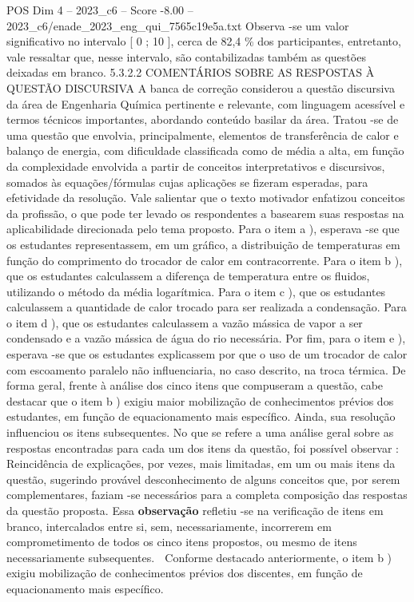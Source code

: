 \begin{textsample}{POS Dim 4 – 2023\_c6 – Score -8.00 – 2023\_c6/enade\_2023\_eng\_qui\_7565c19e5a.txt}
Observa -se um valor significativo no intervalo [ 0 ; 10 ], cerca de 82,4 \% dos participantes, entretanto, vale ressaltar que, nesse intervalo, são contabilizadas também as questões deixadas em branco. 5.3.2.2 COMENTÁRIOS SOBRE AS RESPOSTAS À QUESTÃO DISCURSIVA A banca de correção considerou a questão discursiva da área de Engenharia Química pertinente e relevante, com linguagem acessível e termos técnicos importantes, abordando conteúdo basilar da área.
Tratou -se de uma questão que envolvia, principalmente, elementos de transferência de calor e balanço de energia, com dificuldade classificada como de média a alta, em função da complexidade envolvida a partir de conceitos interpretativos e discursivos, somados às equações/fórmulas cujas aplicações se fizeram esperadas, para efetividade da resolução.
Vale salientar que o texto motivador enfatizou conceitos da profissão, o que pode ter levado os respondentes a basearem suas respostas na aplicabilidade direcionada pelo tema proposto.
Para o item a ), esperava -se que os estudantes representassem, em um gráfico, a distribuição de temperaturas em função do comprimento do trocador de calor em contracorrente.
Para o item b ), que os estudantes calculassem a diferença de temperatura entre os fluidos, utilizando o método da média logarítmica.
Para o item c ), que os estudantes calculassem a quantidade de calor trocado para ser realizada a condensação.
Para o item d ), que os estudantes calculassem a vazão mássica de vapor a ser condensado e a vazão mássica de água do rio necessária.
Por fim, para o item e ), esperava -se que os estudantes explicassem por que o uso de um trocador de calor com escoamento paralelo não influenciaria, no caso descrito, na troca térmica.
De forma geral, frente à análise dos cinco itens que compuseram a questão, cabe destacar que o item b ) exigiu maior mobilização de conhecimentos prévios dos estudantes, em função de equacionamento mais específico.
Ainda, sua resolução influenciou os itens subsequentes.
No que se refere a uma análise geral sobre as respostas encontradas para cada um dos itens da questão, foi possível observar :  Reincidência de explicações, por vezes, mais limitadas, em um ou mais itens da questão, sugerindo provável desconhecimento de alguns conceitos que, por serem complementares, faziam -se necessários para a completa composição das respostas da questão proposta.
Essa \textbf{observação} refletiu -se na verificação de itens em branco, intercalados entre si, sem, necessariamente, incorrerem em comprometimento de todos os cinco itens propostos, ou mesmo de itens necessariamente subsequentes.  Conforme destacado anteriormente, o item b ) exigiu mobilização de conhecimentos prévios dos discentes, em função de equacionamento mais específico.

\end{textsample}
